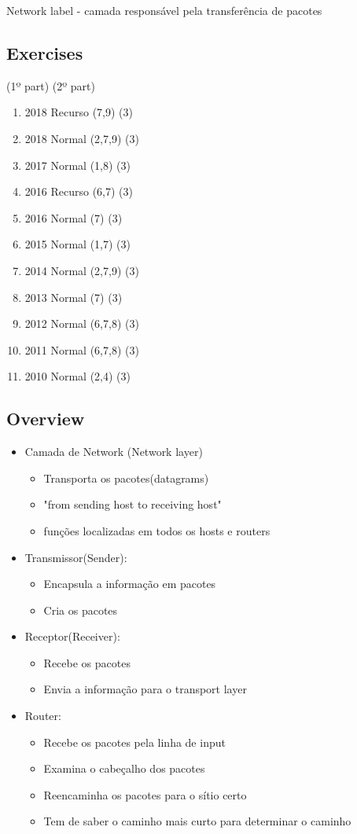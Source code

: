 \documentclass[../resumosRCOM.tex]{subfiles}
\begin{document}
Network label - camada responsável pela transferência de pacotes

\subsection{Exercises}
(1º part) (2º part)
\begin{enumerate}
    \item 2018 Recurso (7,9) (3)
    \item 2018 Normal (2,7,9) (3)
    \item 2017 Normal (1,8) (3)
    \item 2016 Recurso (6,7) (3)
    \item 2016 Normal (7) (3)
    \item 2015 Normal (1,7) (3)
    \item 2014 Normal (2,7,9) (3)
    \item 2013 Normal (7) (3)
    \item 2012 Normal (6,7,8) (3)
    \item 2011 Normal (6,7,8) (3)
    \item 2010 Normal (2,4) (3)
\end{enumerate}

\subsection{Overview}
\begin{itemize}
    \item Camada de Network (Network layer)
    \begin{itemize}
        \item Transporta os pacotes(datagrams)
        \item "from sending host to receiving host"
        \item funções localizadas em todos os hosts e routers
    \end{itemize}
    \item Transmissor(Sender):
    \begin{itemize}
        \item Encapsula a informação em pacotes
        \item Cria os pacotes
    \end{itemize}
    \item Receptor(Receiver):
    \begin{itemize}
        \item Recebe os pacotes
	    \item Envia a informação para o transport layer
    \end{itemize}
    \item Router:
    \begin{itemize}
        \item Recebe os pacotes pela linha de input
        \item Examina o cabeçalho dos pacotes
	    \item Reencaminha os pacotes para o sítio certo
	    \item Tem de saber o caminho mais curto para determinar o caminho
    \end{itemize}
\end{itemize}
\end{document}
